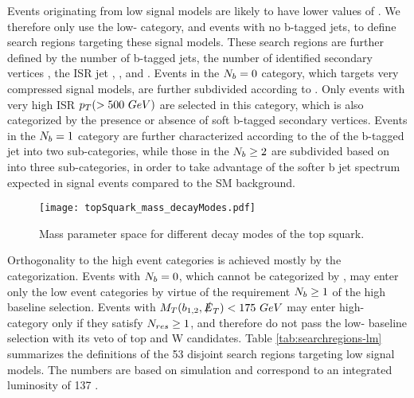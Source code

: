Events originating from low \dm{} signal models are likely to have lower values of \mtb. We therefore only use the low-\mtb{} category, and events with no b-tagged jets, to define search regions targeting these signal models. These search regions are further defined by the number of b-tagged jets, the number of identified secondary vertices \nsv, the ISR jet \pt, \ptb, and \met. Events in the $N_{b}=0$ category, which targets very compressed signal models, are further subdivided according to \nj. Only events with very high ISR $p_{T}(>500~GeV)$ are selected in this category, which is also categorized by the presence or absence of soft b-tagged secondary vertices. Events in the $N_{b}=1$ category are further characterized according to the \pt{} of the b-tagged jet into two sub-categories, while those in the $N_{b}\geq2$ are subdivided based on \ptbonetwo{} into three sub-categories, in order to take advantage of the softer b jet \pt{} spectrum expected in signal events compared to the SM background. 

\begin{figure}
 	\centering
	\texttt{[image: topSquark\_mass\_decayModes.pdf]}
 	\caption[Top Squark Decay Modes]{Mass parameter space for different decay modes of the top squark.}
 	\label{StopParameterSpace} 
\end{figure}

Orthogonality to the high \dm{} event categories is achieved mostly by the \mtb{} categorization. Events with $N_{b}=0$, which cannot be categorized by \mtb, may enter only the low \dm{} event categories by virtue of the requirement $N_{b}\geq1$ of the high \dm{} baseline selection. Events with $M_{T}(b_{1,2},\slashed{E}_{T})<175~GeV$ may enter high-\dm{} category only if they satisfy $N_{res}\geq1$, and therefore do not pass the low-\dm{} baseline selection with its veto of top and W candidates. Table \ref{tab:searchregions-lm}  summarizes the definitions of the 53 disjoint search regions targeting low \dm{} signal models. The numbers are based on simulation and correspond to an integrated luminosity of 137 \fb.


